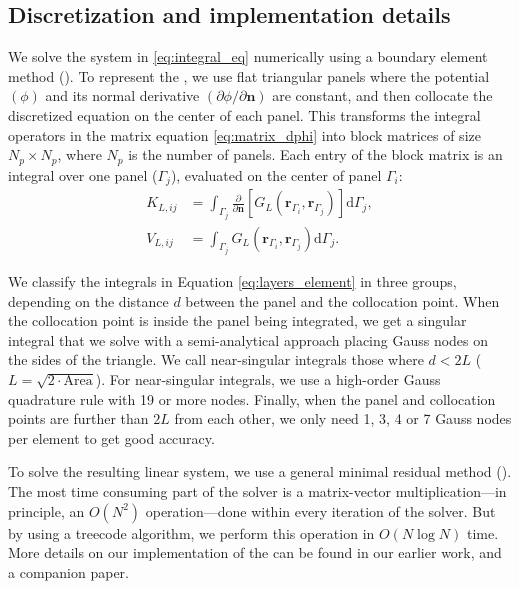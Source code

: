 
\subsection{Discretization and implementation details}

We solve the system in \eqref{eq:integral_eq} numerically using a boundary element method (\bem). To represent the \ses, we use flat triangular panels where the potential $(\phi)$ and its normal derivative $(\partial \phi /\partial \mathbf{n})$ are constant, and then collocate the discretized equation on the center of each panel. This transforms the integral operators in the matrix equation \eqref{eq:matrix_dphi} into block matrices of size $N_p \times N_p$, where $N_p$ is the number of panels. Each entry of the block matrix is an integral over one panel ($\Gamma_j$), evaluated on the center of panel $\Gamma_i$:
%
\begin{align} \label{eq:layers_element}
K_{L,ij} &= \int_{\Gamma_j} \frac{\partial}{\partial \mathbf{n}} \left[ G_L(\mathbf{r}_{\Gamma_i},\mathbf{r}_{\Gamma_j}) \right]\mathrm{d} \Gamma_j, \nonumber \\
V_{L,ij} &= \int_{\Gamma_j} G_L(\mathbf{r}_{\Gamma_i},\mathbf{r}_{\Gamma_j})  \mathrm{d} \Gamma_j.
\end{align}

We classify the integrals in Equation \eqref{eq:layers_element} in three groups, depending on the distance $d$ between the panel and the collocation point. 
When the collocation point is inside the panel being integrated, we get a singular integral that we solve with a semi-analytical approach\cite{ZhuHuangSongWhite2001} placing Gauss nodes on the sides of the triangle. 
We call near-singular integrals those where $d<2L$ ($L = \sqrt{2\cdot \text{Area}}$). For near-singular integrals, we use a high-order Gauss quadrature rule with 19 or more nodes. 
Finally, when the panel and collocation points are further than $2L$ from each other, we only need 1, 3, 4 or 7 Gauss nodes per element to get good accuracy.

To solve the resulting linear system, we use a general minimal residual method (\gmres). The most time consuming part of the \gmres solver is a matrix-vector multiplication---in principle, an $O(N^2)$ operation---done within every iteration of the solver. But by using a treecode algorithm, we perform this operation in $O(N\log N)$ time.\cite{BarnesHut1986} More details on our implementation of the \bem can be found in our earlier work,\cite{CooperBarba-share154331} and a companion paper.\cite{CooperBarba2015a}
